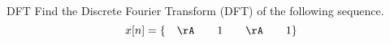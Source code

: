 
% 
\pgfmathsetmacro{}
\pgfmathsetmacro{}


\begin{question}{DFT} 
Find the Discrete Fourier Transform (DFT) of the following sequence.
\[ x[n] = \{ \quad \rA \quad \quad 1 \quad \quad \rA \quad \quad 1 \} \]
  \begin{choices}
  \end{choices}
\vspace*{8em}
\end{question}
